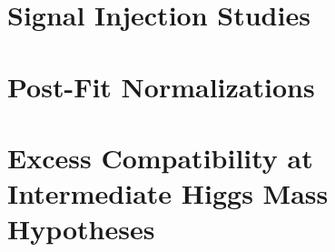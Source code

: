 \documentclass{cmspaper}
\begin{document}
\section{Signal Injection Studies}
     \label{app:sig_inj}
     

\section{Post-Fit Normalizations}
     \label{app:postfit_norm}
     

\section{Excess Compatibility at Intermediate Higgs Mass Hypotheses}
     \label{app:appendix_excess_m200}
     
\end{document}
